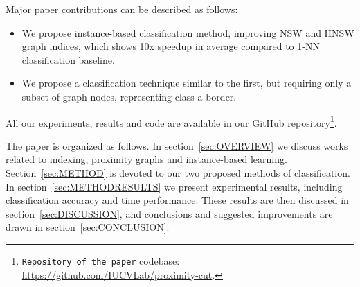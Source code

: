Major paper contributions can be described as follows:
\begin{itemize}
    \item We propose instance-based classification method, improving NSW and HNSW graph indices, which shows 10x speedup in average compared to 1-NN classification baseline.
    \item We propose a classification technique similar to the first, but requiring only a subset of graph nodes, representing class a border.
\end{itemize}

All our experiments, results and code are available in our GitHub repository\footnote{\texttt{Repository of the paper} codebase: \url{https://github.com/IUCVLab/proximity-cut}.}.

The paper is organized as follows.
In section~\ref{sec:OVERVIEW} we discuss works related to indexing, proximity graphs and instance-based learning.
Section~\ref{sec:METHOD} is devoted to our two proposed methods of classification.
In section~\ref{sec:METHODRESULTS} we present experimental results, including classification accuracy and time performance.
These results are then discussed in section~\ref{sec:DISCUSSION},
and conclusions and suggested improvements are drawn in section~\ref{sec:CONCLUSION}.
